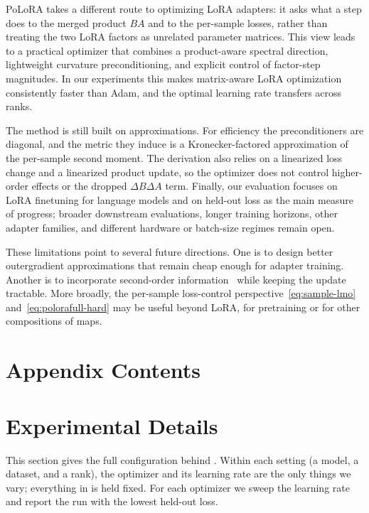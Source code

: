 \documentclass[11pt]{article}
\newcommand{\methodname}{PoLoRA\xspace}
\theoremstyle{plain}
\theoremstyle{definition}
\theoremstyle{remark}
\theoremstyle{definition}
\begin{document}
\methodname{} takes a different route to optimizing LoRA adapters: it asks what a step does to the merged product $BA$ and to the per-sample losses, rather than treating the two LoRA factors as unrelated parameter matrices. This view leads to a practical optimizer that combines a product-aware spectral direction, lightweight curvature preconditioning, and explicit control of factor-step magnitudes. In our experiments this makes matrix-aware LoRA optimization consistently faster than Adam, and the optimal learning rate transfers across ranks.

The method is still built on approximations. For efficiency the preconditioners are diagonal, and the metric they induce is a Kronecker-factored approximation of the per-sample second moment. The derivation also relies on a linearized loss change and a linearized product update, so the optimizer does not control higher-order effects or the dropped $\Delta B\Delta A$ term. Finally, our evaluation focuses on LoRA finetuning for language models and on held-out loss as the main measure of progress; broader downstream evaluations, longer training horizons, other adapter families, and different hardware or batch-size regimes remain open.

These limitations point to several future directions. One is to design better outergradient approximations that remain cheap enough for adapter training. Another is to incorporate second-order information~\cite{du2026newtonmuonoptimizer} while keeping the update tractable. More broadly, the per-sample loss-control perspective~\eqref{eq:sample-lmo} and~\eqref{eq:polorafull-hard} may be useful beyond LoRA, for pretraining or for other compositions of maps.

\printbibliography


\clearpage
\appendix
\startcontents[app]
\section*{Appendix Contents}
\clearpage
\section{Experimental Details}
\label{app:exp}
This section gives the full configuration behind . Within each setting (a model, a dataset, and a rank), the optimizer and its learning rate are the only things we vary; everything in  is held fixed. For each optimizer we sweep the learning rate and report the run with the lowest held-out loss.
\end{document}
